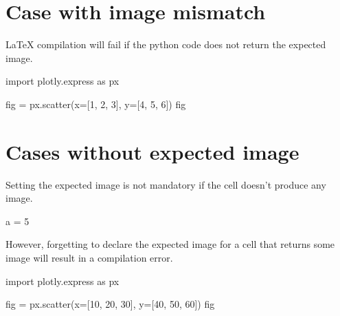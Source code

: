 \documentclass[oneside]{book}
\begin{document}
\chapter{Case with image mismatch}

LaTeX compilation will fail if the python code does not return the expected image.

\begin{pycell}
import plotly.express as px

fig = px.scatter(x=[1, 2, 3], y=[4, 5, 6])
fig
\end{pycell}

\chapter{Cases without expected image}

Setting the expected image is not mandatory if the cell doesn't produce any image.

\begin{pycell}
a = 5
\end{pycell}

However, forgetting to declare the expected image for a cell that returns some image will result in a compilation error.
\begin{pycell}
import plotly.express as px

fig = px.scatter(x=[10, 20, 30], y=[40, 50, 60])
fig
\end{pycell}

\ifPythonTeXLoaded
\else
\fi
\end{document}
